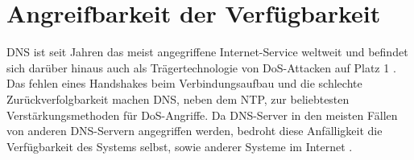 \section{Angreifbarkeit der Verfügbarkeit}
\label{sec:thread-dosamp}

DNS ist seit Jahren das meist angegriffene Internet-Service weltweit und befindet sich darüber hinaus auch als Trägertechnologie von DoS-Attacken auf Platz 1 \cite{Alcoy2017}. Das fehlen eines Handshakes beim Verbindungsaufbau und die schlechte Zurückverfolgbarkeit machen DNS, neben dem \ac{NTP}, zur beliebtesten Verstärkungsmethoden für DoS-Angriffe. Da DNS-Server in den meisten Fällen von anderen DNS-Servern angegriffen werden, bedroht diese Anfälligkeit die Verfügbarkeit des Systems selbst, sowie anderer Systeme im Internet \cite{Kambourakis2008}.